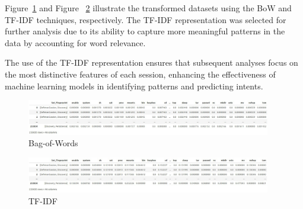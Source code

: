         Figure~\ref{fig:bow} and Figure ~\ref{fig:tf-idf} illustrate the transformed datasets using the BoW and TF-IDF techniques, respectively. The TF-IDF representation was selected for further analysis due to its ability to capture more meaningful patterns in the data by accounting for word relevance.

        The use of the TF-IDF representation ensures that subsequent analyses focus on the most distinctive features of each session, enhancing the effectiveness of machine learning models in identifying patterns and predicting intents.
        
        \begin{figure}[H]
            \centering
            \includegraphics[width=0.95\textwidth]{../figures/others/dataset_bow_1.png}
            \vspace{-0.3cm}
            \caption{Bag-of-Words}
            \label{fig:bow}
        \end{figure}
        
        \vspace{-0.5cm}
        
        \begin{figure}[H]
            \centering
            \includegraphics[width=0.95\textwidth]{../figures/others/dataset_tf-idf_1.png}
            \vspace{-0.3cm}
            \caption{TF-IDF}
            \label{fig:tf-idf}
        \end{figure}
